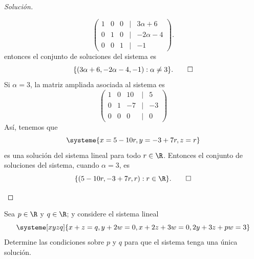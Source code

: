 \documentclass[a4,11pt]{aleph-notas}
\begin{document}
\begin{proof}[Solución]
\begin{enumerate}
    \[
        \begin{pmatrix}
        1&0&0&|& 3 \alpha+6\\
        0&1&0&|&-2\alpha - 4\\
        0&0&1&|& -1
        \end{pmatrix}               .
    \]
    entonces el conjunto de soluciones del sistema es 
    \[
        \{(3 \alpha+6,-2\alpha - 4,-1):\alpha \neq 3\}.\qedhere
    \]
    Si $\alpha = 3 $, la matriz ampliada asociada al sistema es
    \[
        \begin{pmatrix}
        1&0&10&|&5\\
        0&1&-7&|&-3\\
        0&0&0&|&0
        \end{pmatrix}
    \]
    Así, tenemos que
    \[
    \systeme{x = 5 - 10r, y= -3 +7r, z= r}
    \]
    es una solución del sistema lineal para todo $r \in \R$. Entonces el conjunto de soluciones del sistema, cuando $\alpha = 3$, es
    \[
        \{(5 - 10r,-3 +7r,r):r \in \R\}.\qedhere
    \]
    
 \end{enumerate}
\end{proof}


\begin{ejer}
    Sea $p \in \R$ y $q \in \R$; y considere el sistema lineal
    \[
    \systeme[xyzq]{x+z=q, y+2w=0, x+2z+3w=0, 2y+3z+pw=3}
    \]
    Determine las condiciones sobre $p$ y $q$ para que el sistema tenga una única solución.
\end{ejer}
\end{document}
